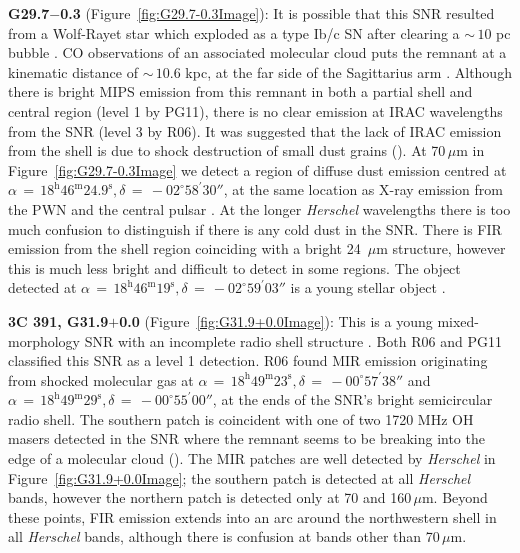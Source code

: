\documentclass[fleqn,usenatbib]{mnras}
\begin{document}
{\textbf{G29.7$-$0.3} (Figure~\ref{fig:G29.7-0.3Image}): It is possible that this SNR resulted from a Wolf-Rayet star which exploded as a type Ib/c SN  after clearing a $\sim\,10$ pc bubble \citep{Morton2007}. CO observations of an associated molecular cloud puts the remnant at a kinematic distance of $\sim\,10.6$ kpc, at the far side of the Sagittarius arm \citep{Su2009}. Although there is bright MIPS emission from this remnant in both a partial shell and central region (level 1 by PG11), there is no clear emission at IRAC wavelengths from the SNR (level 3 by R06). It was suggested that the lack of IRAC emission from the shell is due to shock destruction of small dust grains (\citealp{Morton2007}).
At 70\,$\mu$m in Figure~\ref{fig:G29.7-0.3Image} we detect a region of diffuse dust emission centred at $\alpha\,=\,18^\text{h}46^\text{m}24.9^\text{s}, \delta\,=\,-02^\circ58^\prime30''$, at the same location as X-ray emission from the PWN and the central pulsar \citep{Helfand2003}. At the longer \textit{Herschel} wavelengths there is too much confusion to distinguish if there is any cold dust in the SNR. There is FIR emission from the shell region coinciding with a bright 24~$\mu$m structure, however this is much less bright and difficult to detect in some regions.
The object detected at $\alpha\,=\,18^\text{h}46^\text{m}19^\text{s}, \delta\,=\,-02^\circ59^\prime03''$ is a young stellar object \citep{Veneziani2013}.
\bigskip

\textbf{3C 391, G31.9$+$0.0} (Figure~\ref{fig:G31.9+0.0Image}): This is a young mixed-morphology SNR with an incomplete radio shell structure \citep{Goss1979}.
Both R06 and PG11 classified this SNR as  a level 1 detection. R06 found MIR emission originating from shocked molecular gas at $\alpha\,=\,18^\text{h}49^\text{m}23^\text{s}, \delta\,=\,-00^\circ57^\prime38''$ and $\alpha\,=\,18^\text{h}49^\text{m}29^\text{s}, \delta\,=\,-00^\circ55^\prime00''$, at the ends of the SNR's bright semicircular radio shell. The southern patch is coincident with one of two 1720 MHz OH masers detected in the SNR where the remnant seems to be breaking into the edge of a molecular cloud (\citealp{Frail1996}).
The MIR patches are well detected by \textit{Herschel} in Figure~\ref{fig:G31.9+0.0Image}; the southern patch is detected at all \textit{Herschel} bands, however the northern patch is detected only at 70 and 160\,$\mu$m. Beyond these points, FIR emission extends into an arc around the northwestern shell in all \textit{Herschel} bands, although there is confusion at bands other than 70\,$\mu$m.

}
\end{document}
